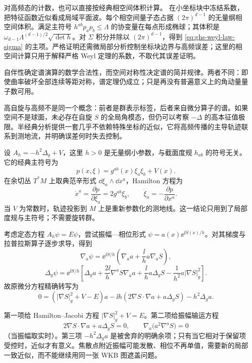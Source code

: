 对高频态的计数，也可以直接按经典相空间体积计算。
在小坐标块中冻结系数，把特征函数近似看成局域平面波。每个相空间量子态占据 $(2\pi)^{d-1}$ 的无量纲相空间体积。满足主符号 $h^{ab}p_ap_b\leq\Lambda$ 的协变量在每点形成椭球；其体积是 $\omega_{d-1}\Lambda^{(d-1)/2}\sqrt{\det h}$。对 $\Sigma$ 积分并除以 $(2\pi)^{d-1}$，得到 \cref{eq:ghs-weyl-law-sigma} 的主项。严格证明还需微局部分析控制坐标块边界与高频误差；这里的相空间计算只用于解释严格 Weyl 定理的系数，不取代其误差证明。

自伴性确定谱演算的数学合法性，而空间对称性决定谱的简并规律。两者不同：即使曲率破坏全部连续等距对称，谱定理仍成立；只是再没有普遍意义上的角动量量子数可用。

高自旋与高频不是同一个概念：前者是群表示标签，后者来自微分算子的谱。如果空间不是球面，未必存在自旋 $S$ 的全局角模态，但仍可以考察 $-\Delta$ 的高本征值极限。半经典分析提供一套几乎不依赖特殊坐标的近似，它将高频传播的主导轨迹联系到测地流，并明确误差何时失去控制。

设 $A_h=-h^2\Delta_g+V$，这里 $h>0$ 是无量纲小参数，与截面度规 $h_{ab}$ 的符号无关。它的经典主符号为
\begin{equation}\label{eq:ghs-semiclassical-principal-symbol}
 p(x,\xi)=g^{ab}(x)\xi_a\xi_b+V(x).
\end{equation}
在余切丛 $T^*M$ 上取典范辛形式 $\dd\xi_a\wedge\dd x^a$，Hamilton 方程为
\[
 \dot x^a=\frac{\partial p}{\partial\xi_a}=2g^{ab}\xi_b,
 \qquad\dot\xi_a=-\frac{\partial p}{\partial x^a}.
\]
当 $V$ 为常数时，轨迹投影到 $M$ 上是重新参数化的测地线。这一结论只用到了局部度规与主符号；不需要旋转群。

考虑定态方程 $A_h\psi=E\psi$，尝试振幅—相位形式 $\psi=a(x)\ee^{\ii S(x)/h}$。对其梯度与 拉普拉斯算子逐步求导，得到
\[
 \nabla_a\psi=\ee^{\ii S/h}
 \left(\nabla_aa+\frac{\ii}{h}a\nabla_aS\right),
\]
\[
 \Delta_g\psi=\ee^{\ii S/h}
 \left[\Delta_ga+\frac{2\ii}{h}\nabla^aS\nabla_aa
 +\frac{\ii}{h}a\Delta_gS-\frac1{h^2}a|\nabla S|_g^2\right].
\]
故原微分方程精确转写为
\begin{equation}\label{eq:ghs-wkb-exact-expansion}
 0=(|\nabla S|_g^2+V-E)a
 -\ii h\left(2\nabla S\cdot\nabla a+a\Delta_gS\right)
 -h^2\Delta_ga.
\end{equation}

第一项给 Hamilton--Jacobi 方程 $|\nabla S|_g^2+V=E$。第二项给振幅输运方程
\[
 2\nabla S\cdot\nabla a+a\Delta_gS=0,
 \qquad\nabla_a\bigl(a^2\nabla^aS\bigr)=0
\]
（当振幅取实时）。第三项 $-h^2\Delta_ga$ 是被舍弃的明确余项；只有当它相对于保留项受控时，近似才有意义。焦散点附近振幅可能发散、相位不再单值，需要新的局部一致近似，而不能继续用同一张 WKB 图遮盖问题。

